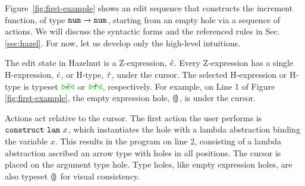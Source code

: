 
%
Figure~\ref{fig:first-example} shows an edit sequence that constructs the increment function, of type $\texttt{num} \rightarrow \texttt{num}$, starting from an empty hole via a sequence of {actions}. We will discuss the syntactic forms and the referenced rules in Sec. \ref{sec:hazel}. For now, let us develop only the high-level intuitions. 



The edit state in Hazelnut is a {Z-expression}, $\hat{e}$. Every Z-expression has a single {H-expression}, $\dot{e}$, or {H-type}, $\dot{\tau}$, under the {cursor}. The selected H-expression or H-type is typeset $\zwsel{\hexp}$ or $\zwsel{\htau}$, respectively. For example, on Line 1 of Figure \ref{fig:first-example}, the empty expression hole, $\llparenthesis\rrparenthesis$, is under the cursor. 

Actions act relative to the cursor. The first action the user performs is $\mathtt{construct}~\mathtt{lam}~x$, which instantiates the hole with a lambda abstraction binding the variable $x$. This results in the program on line
2, consisting of a lambda abstraction ascribed an arrow type with holes in all positions. The cursor is placed on the argument type hole. Type holes, like empty expression holes, are also typeset $\llparenthesis\rrparenthesis$ for visual consistency. 

